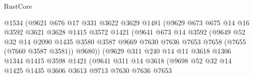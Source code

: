 \begin{lexlean}{RustCore}
\begin{coremodule}
                            @1534
                            (@9621
                              @676
                              @17
                              @331
                              @3622
                              @3629
                              @1481
                              (@9629
                                @673
                                @675
                                @14
                                @16
                                @3592
                                @3621
                                @3628
                                @1415
                                @3572
                                @1421
                                (@9641
                                  @673
                                  @14
                                  @3592
                                  (@9649
                                    @52
                                    @32
                                    @14
                                    @2090
                                    @1435
                                    @3580
                                    @3587
                                    @9669
                                    @7630
                                    @7636
                                    @7653
                                    @7658
                                    (@7655 (@7660 @3587 @3581))
                                    @9680))
                                (@9629
                                  @311
                                  @240
                                  @14
                                  @11
                                  @3618
                                  @1306
                                  @1344
                                  @1415
                                  @3598
                                  @1421
                                  (@9641
                                    @311
                                    @14
                                    @3618
                                    (@9698
                                      @52
                                      @32
                                      @14
                                      @1425
                                      @1435
                                      @3606
                                      @3613
                                      @9713
                                      @7630
                                      @7636
                                      @7653

\end{coremodule}
\end{lexlean}
